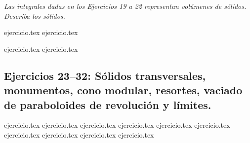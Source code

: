 \noindent \textit{Las integrales dadas en los Ejercicios 19 a 22 representan volúmenes de sólidos. Describa los sólidos.}

\begin{enumerate}
    \setcounter{enumi}{18}
    \begin{minipage}{0.45\textwidth}
    {ejercicio.tex}
    {ejercicio.tex}
    \end{minipage}%
    \begin{minipage}{0.45\textwidth}
    {ejercicio.tex}
    {ejercicio.tex}
    \end{minipage}
\end{enumerate}

\subsection*{Ejercicios 23--32: Sólidos transversales, monumentos, cono modular, resortes, vaciado de paraboloides de revolución y límites.}

\begin{enumerate}
    \setcounter{enumi}{22}
    {ejercicio.tex}
    {ejercicio.tex}
    {ejercicio.tex}
    {ejercicio.tex}
    {ejercicio.tex}
    {ejercicio.tex}
    {ejercicio.tex}
    {ejercicio.tex}
    {ejercicio.tex}
    {ejercicio.tex}
\end{enumerate}
